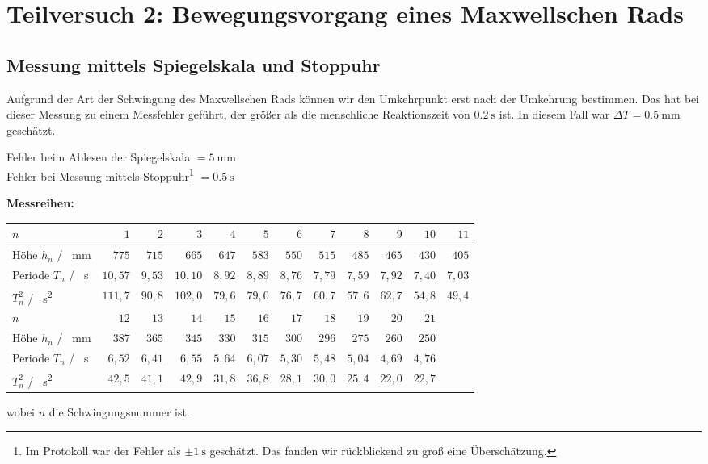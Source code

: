 \newpage
\section{Teilversuch 2: Bewegungsvorgang eines Maxwellschen Rads}
    \subsection{Messung mittels Spiegelskala und Stoppuhr}
        Aufgrund der Art der Schwingung des Maxwellschen Rads können wir den Umkehrpunkt erst nach der Umkehrung bestimmen. Das hat bei dieser Messung zu einem Messfehler geführt, der größer als die menschliche Reaktionszeit von $\SI{0.2}{\second}$ ist. In diesem Fall war $\Delta T = \SI{0,5}{\milli\meter}$ geschätzt. 

        Fehler beim Ablesen der Spiegelskala $= \SI{5}{\milli\meter}$\\
        Fehler bei Messung mittels Stoppuhr\footnote{Im Protokoll war der Fehler als $\pm \SI{1}{\second}$ geschätzt. Das fanden wir rückblickend zu groß eine Überschätzung.} $= \SI{0,5}{\second}$

        \textbf{Messreihen:}
        \begin{center}
            \begin{tabular}{l *{11}{r}}
                \toprule
                $n$ & $1$ & $2$ & $3$ & $4$ & $5$ & $6$ & $7$ & $8$ & $9$ & $10$ & $11$ \\
                \midrule
                Höhe $h_n$ / \SI{}{\milli\meter} & $775$ & $715$ & $665$ & $647$ & $583$ & $550$ & $515$ & $485$ & $465$ & $430$ & $405$ \\
                Periode $T_n$ / \SI{}{\second} & $10,57$ & $9,53$ & $10,10$ & $8,92$ & $8,89$ & $8,76$ & $7,79$ & $7,59$  & $7,92$ & $7,40$ & $7,03$  \\
                $T_n^2$ / \SI{}{\second\squared} & $111,7$ & $90,8$ & $102,0$ & $79,6$ & $79,0$ & $76,7$ & $60,7$ & $57,6$ & $62,7$ & $54,8$ & $49,4$ \\
                \bottomrule
                \toprule
                $n$ & $12$ & $13$ & $14$ & $15$ & $16$ & $17$ & $18$ & $19$ & $20$ & $21$ &  \\
                \midrule
                Höhe $h_n$ / \SI{}{\milli\meter} & $387$ & $365$ & $345$ & $330$ & $315$ & $300$ & $296$ & $275$ & $260$ & $250$  & \\
                Periode $T_n$ / \SI{}{\second} & $6,52$ & $6,41$ & $6,55$ & $5,64$ & $6,07$ & $5,30$ & $5,48$ & $5,04$ & $4,69$ & $4,76$ &  \\
                $T_n^2$ / \SI{}{\second\squared} & $42,5$ & $41,1$ & $42,9$ & $31,8$ & $36,8$ & $28,1$ & $30,0$ & $25,4$ & $22,0$ & $22,7$ & \\
                \bottomrule
            \end{tabular}
        \end{center}
        wobei $n$ die Schwingungsnummer ist. 

